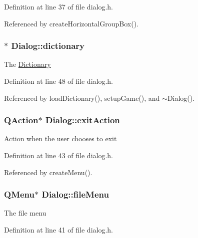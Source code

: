 Definition at line 37 of file dialog.\-h.



Referenced by create\-Horizontal\-Group\-Box().

\hypertarget{class_dialog_a465c936ff76ad97698bde2a9b065ab65}{
\subsubsection[{dictionary}]{$\ast$ Dialog\-::dictionary\hspace{0.3cm}{\ttfamily [private]}}}\label{class_dialog_a465c936ff76ad97698bde2a9b065ab65}
The \hyperlink{class_dictionary}{Dictionary} 

Definition at line 48 of file dialog.\-h.



Referenced by load\-Dictionary(), setup\-Game(), and $\sim$\-Dialog().

\hypertarget{class_dialog_abf163ec5a4490e0019241f39e3e81b48}{
\subsubsection[{exit\-Action}]{\setlength{\rightskip}{0pt plus 5cm}Q\-Action$\ast$ Dialog\-::exit\-Action\hspace{0.3cm}{\ttfamily [private]}}}\label{class_dialog_abf163ec5a4490e0019241f39e3e81b48}
Action when the user chooses to exit 

Definition at line 43 of file dialog.\-h.



Referenced by create\-Menu().

\hypertarget{class_dialog_a266ec552501a452ce6925589823e8484}{
\subsubsection[{file\-Menu}]{\setlength{\rightskip}{0pt plus 5cm}Q\-Menu$\ast$ Dialog\-::file\-Menu\hspace{0.3cm}{\ttfamily [private]}}}\label{class_dialog_a266ec552501a452ce6925589823e8484}
The file menu 

Definition at line 41 of file dialog.\-h.



